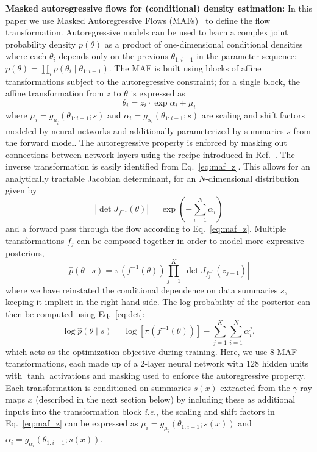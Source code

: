 \documentclass[prd,aps,10pt,nofootinbib,twocolumn,superscriptaddress,preprintnumbers,balancelastpage,longbibliography]{revtex4-1}
\begin{document}
\noindent
\textbf{Masked autoregressive flows for (conditional) density estimation:}
In this paper we use Masked Autoregressive Flows (MAFs)~\cite{10.5555/3294771.3294994} to define the flow transformation. Autoregressive models can be used to learn a complex joint probability density $p(\theta)$ as a product of one-dimensional conditional densities where each $\theta_i$ depends only on the previous $\theta_{1:i-1}$ in the parameter sequence: $p(\theta) = \prod_i p(\theta_i\mid \theta_{1:i-1})$. The MAF is built using blocks of affine transformations subject to the autoregressive constraint; for a single block, the affine transformation from $z$ to $\theta$ is expressed as 
\begin{equation}
\label{eq:maf_z}
\theta_{i}=z_{i}\cdot \exp \alpha_{i}+\mu_{i} 
\end{equation}
where $\mu_{i}=g_{\mu_{i}}\left({\theta}_{1: i-1} ; {s}\right)$ and $\alpha_i = g_{\alpha_{i}}\left({\theta}_{1: i-1} ; {s}\right)$ are scaling and shift factors modeled by neural networks and additionally parameterized by summaries $s$ from the forward model. The autoregressive property is enforced by masking out connections between network layers using the recipe introduced in Ref.~\cite{germain2015made}. The inverse transformation is easily identified from Eq.~\eqref{eq:maf_z}. This allows for an analytically tractable Jacobian determinant, for an $N$-dimensional distribution given by
\begin{equation}
\label{eq:det}
\left|\operatorname{det}J_{f^{-1}}(\theta)\right|=\exp \left(-\sum_{i=1}^N \alpha_{i}\right)
\end{equation}
and a forward pass through the flow according to Eq.~\eqref{eq:maf_z}.
Multiple transformations $f_j$ can be composed together in order to model more expressive posteriors,
\begin{equation}
\hat{p}({\theta}\mid s)=\pi\left(f^{-1}({\theta})\right) \prod_{j=1}^{K}\left|\operatorname{det}J_{f^{-1}_j}(z_{j-1})\right|
\end{equation}
where we have reinstated the conditional dependence on data summaries $s$, keeping it implicit in the right hand side. The log-probability of the posterior can then be computed using Eq.~\eqref{eq:det}:
\begin{equation}
\label{eq:objective}
\log \hat{p}({\theta}\mid s) = \log \left[\pi\left(f^{-1}({\theta})\right)\right]-\sum_{j=1}^{K} \sum_{i=1}^{N} \alpha_{i}^{j},
\end{equation}
which acts as the optimization objective during training. Here, we use 8 MAF transformations, each made up of a 2-layer neural network with 128 hidden units with $\tanh$ activations and masking used to enforce the autoregressive property. Each transformation is conditioned on summaries $s(x)$ extracted from the $\gamma$-ray maps $x$ (described in the next section below) by including these as additional inputs into the transformation block \emph{i.e.}, the scaling and shift factors in Eq.~\eqref{eq:maf_z} can be expressed as $\mu_{i}=g_{\mu_{i}}\left({\theta}_{1: i-1} ; {s(x)}\right)$ and $\alpha_i = g_{\alpha_{i}}\left({\theta}_{1: i-1} ; {s(x)}\right)$.
\end{document}
